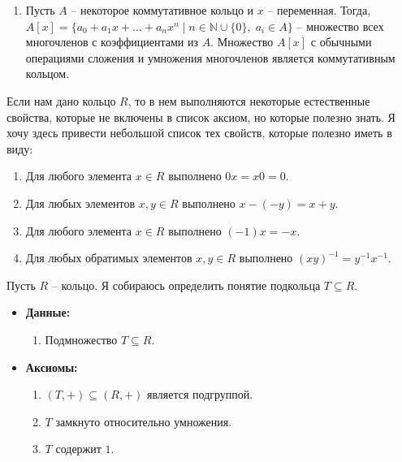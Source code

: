 \begin{examples}
\begin{enumerate}
\item Пусть $A$ -- некоторое коммутативное кольцо и $x$ -- переменная.
Тогда, $A[x] = \{a_0 + a_1 x + \ldots + a_n x^n \mid n\in \mathbb N\cup\{0\},\; a_i\in A\}$ -- множество всех многочленов с коэффициентами из $A$.
Множество $A[x]$ с обычными операциями сложения и умножения многочленов является коммутативным кольцом.
\end{enumerate}
\end{examples}

\begin{remark}
Если нам дано кольцо $R$, то в нем выполняются некоторые естественные свойства, которые не включены в список аксиом, но которые полезно знать.
Я хочу здесь привести небольшой список тех свойств, которые полезно иметь в виду:
\begin{enumerate}
\item Для любого элемента $x\in R$ выполнено $0 x = x 0  = 0$.

\item Для любых элементов $x, y\in R$ выполнено $x - (-y) = x + y$.

\item Для любого элемента $x\in R$ выполнено $(-1) x = - x$.

\item Для любых обратимых элементов $x,y\in R$ выполнено $(xy)^{-1} = y^{-1}x^{-1}$.
\end{enumerate}
\end{remark}

\begin{definition}
Пусть $R$ -- кольцо.
Я собираюсь определить понятие подкольца $T\subseteq R$.
\begin{itemize}
\item\textbf{Данные:} 
\begin{enumerate}
\item Подмножество $T\subseteq R$.
\end{enumerate}

\item\textbf{Аксиомы:}
\begin{enumerate}
\item $(T, +)\subseteq (R, +)$ является подгруппой.

\item $T$ замкнуто относительно умножения.

\item $T$ содержит $1$.
\end{enumerate}
\end{itemize}
\end{definition}

